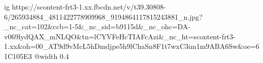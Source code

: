  
 
 
 
 

\ifcmt
  ig https://scontent-frt3-1.xx.fbcdn.net/v/t39.30808-6/265934884_4811422778909968_9194864117815243881_n.jpg?_nc_cat=102&ccb=1-5&_nc_sid=b9115d&_nc_ohc=DA-v069lydQAX_mNLQO&tn=lCYVFeHcTIAFcAzi&_nc_ht=scontent-frt3-1.xx&oh=00_AT9d9vMcL5hDmdjpe5h9lChaSn8F1t7wxC3im1m9ABA6Sw&oe=61C105E3
  @width 0.4
\fi
